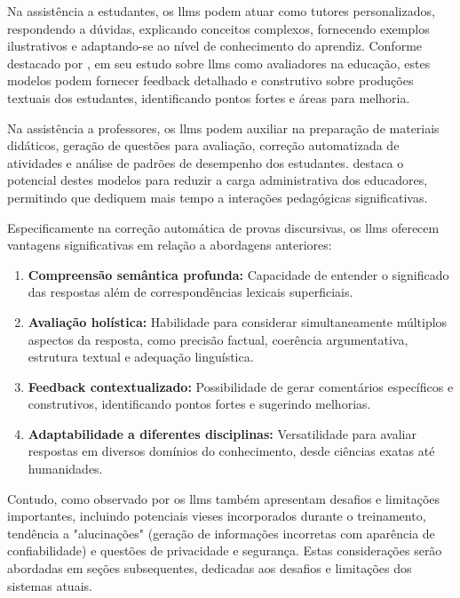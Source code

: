 Na assistência a estudantes, os \gls{llm}s podem atuar como tutores personalizados, respondendo a dúvidas, explicando conceitos complexos, fornecendo exemplos ilustrativos e adaptando-se ao nível de conhecimento do aprendiz. Conforme destacado por , em seu estudo sobre \gls{llm}s como avaliadores na educação, estes modelos podem fornecer feedback detalhado e construtivo sobre produções textuais dos estudantes, identificando pontos fortes e áreas para melhoria.

Na assistência a professores, os \gls{llm}s podem auxiliar na preparação de materiais didáticos, geração de questões para avaliação, correção automatizada de atividades e análise de padrões de desempenho dos estudantes.  destaca o potencial destes modelos para reduzir a carga administrativa dos educadores, permitindo que dediquem mais tempo a interações pedagógicas significativas.

Especificamente na correção automática de provas discursivas, os \gls{llm}s oferecem vantagens significativas em relação a abordagens anteriores:

\begin{enumerate}
  \item \textbf{Compreensão semântica profunda:} Capacidade de entender o significado das respostas além de correspondências lexicais superficiais.
  
  \item \textbf{Avaliação holística:} Habilidade para considerar simultaneamente múltiplos aspectos da resposta, como precisão factual, coerência argumentativa, estrutura textual e adequação linguística.
  
  \item \textbf{Feedback contextualizado:} Possibilidade de gerar comentários específicos e construtivos, identificando pontos fortes e sugerindo melhorias.
  
  \item \textbf{Adaptabilidade a diferentes disciplinas:} Versatilidade para avaliar respostas em diversos domínios do conhecimento, desde ciências exatas até humanidades.
\end{enumerate}

Contudo, como observado por  os \gls{llm}s também apresentam desafios e limitações importantes, incluindo potenciais vieses incorporados durante o treinamento, tendência a "alucinações" (geração de informações incorretas com aparência de confiabilidade) e questões de privacidade e segurança. Estas considerações serão abordadas em seções subsequentes, dedicadas aos desafios e limitações dos sistemas atuais.

